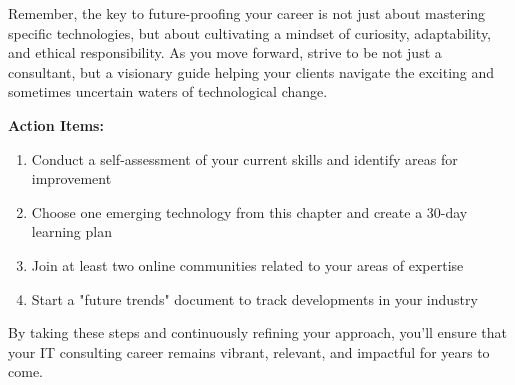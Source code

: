 Remember, the key to future-proofing your career is not just about mastering specific technologies, but about cultivating a mindset of curiosity, adaptability, and ethical responsibility. As you move forward, strive to be not just a consultant, but a visionary guide helping your clients navigate the exciting and sometimes uncertain waters of technological change.

\textbf{Action Items:}
\begin{enumerate}
    \item Conduct a self-assessment of your current skills and identify areas for improvement
    \item Choose one emerging technology from this chapter and create a 30-day learning plan
    \item Join at least two online communities related to your areas of expertise
    \item Start a "future trends" document to track developments in your industry
\end{enumerate}


By taking these steps and continuously refining your approach, you'll ensure that your IT consulting career remains vibrant, relevant, and impactful for years to come.